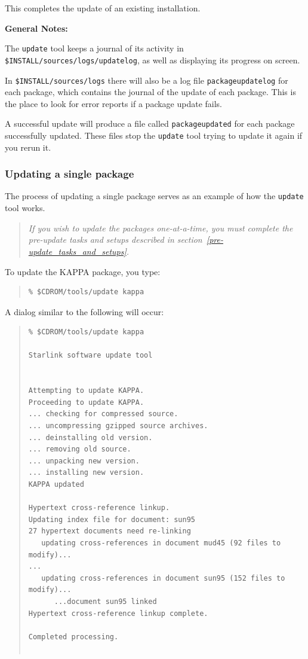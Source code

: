 \documentclass[twoside,11pt]{article}
\newcommand{\htmlref}[2]{#1}
\newcommand{\latex}[1]{#1}
\renewcommand{\_}{\texttt{\symbol{95}}}
\begin{document}
This completes the update of an existing installation.

\textbf{General Notes:} 

The \texttt{update} tool keeps a journal of its activity in 
\texttt{\$INSTALL/sources/logs/update\_log}, as well as 
displaying its progress on screen.  

In \texttt{\$INSTALL/sources/logs} there will also be a log file
\texttt{package\_update\_log} for each package, which contains the
journal of the update of each package.  This is the place to look for
error reports if a package update fails.

A successful update will produce a file called \texttt{package\_updated}
for each package successfully updated.  These files stop the
\texttt{update} tool trying to update it again if you rerun it.

\subsubsection{Updating a single package}

The process of updating a single package serves as an example of how the
\texttt{update} tool works.

\begin{quote}
\textit{If you wish to update the packages one-at-a-time, you must
complete the \htmlref{pre-update tasks and setups}{pre-update_tasks_and_setups}
\latex{described in section~\ref{pre-update_tasks_and_setups}}.}
\end{quote}

To update the KAPPA package, you type:

\begin{quote}
\begin{verbatim}
% $CDROM/tools/update kappa
\end{verbatim}
\end{quote}

A dialog similar to the following will occur:

\begin{quote}
\begin{small}
\begin{verbatim}
% $CDROM/tools/update kappa
 
Starlink software update tool
 
 
Attempting to update KAPPA.
Proceeding to update KAPPA.
... checking for compressed source.
... uncompressing gzipped source archives.
... deinstalling old version.
... removing old source.
... unpacking new version.
... installing new version.
KAPPA updated
 
Hypertext cross-reference linkup.
Updating index file for document: sun95
27 hypertext documents need re-linking
   updating cross-references in document mud45 (92 files to modify)...
...
   updating cross-references in document sun95 (152 files to modify)...
      ...document sun95 linked
Hypertext cross-reference linkup complete.
 
Completed processing.
 
\end{verbatim}
\end{small}
\end{quote}
\end{document}
